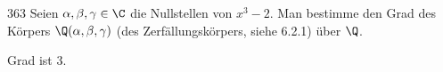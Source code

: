 \begin{algebraUE}{363}
  Seien $\alpha, \beta, \gamma \in \C$ die Nullstellen von $x^3 - 2.$ Man bestimme den Grad des Körpers $\Q(\alpha, \beta, \gamma)$ (des Zerfällungskörpers, siehe 6.2.1) über $\Q$.
\end{algebraUE}

\begin{solution}
Grad ist 3.
\end{solution}
